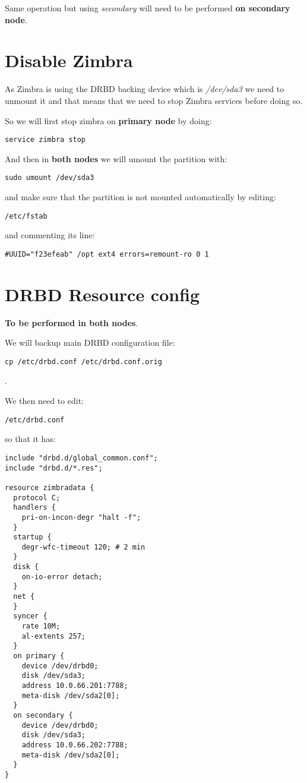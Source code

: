 Same operation but using \textit{secondary} will need to be performed \textbf{on secondary node}.

\section {Disable Zimbra}
As Zimbra is using the DRBD backing device which is \textit{/dev/sda3} we need to unmount it and that means that we need to stop Zimbra services before doing so.

So we will first stop zimbra on \textbf{primary node} by doing:
\begin{verbatim}
service zimbra stop
\end{verbatim}

And then in \textbf{both nodes} we will umount the partition with:
\begin{verbatim}
sudo umount /dev/sda3
\end{verbatim}
and make sure that the partition is not mounted automatically by editing:
\begin{verbatim}
/etc/fstab
\end{verbatim}
and commenting its line:
\begin{verbatim}
#UUID="f23efeab" /opt ext4 errors=remount-ro 0 1
\end{verbatim}

\section {DRBD Resource config}
\textbf{To be performed in both nodes}.

We will backup main DRBD configuration file:
\begin{verbatim}
cp /etc/drbd.conf /etc/drbd.conf.orig
\end{verbatim}
.

We then need to edit:
\begin{verbatim}
/etc/drbd.conf
\end{verbatim}
so that it has:
\begin{verbatim}
include "drbd.d/global_common.conf";
include "drbd.d/*.res";

resource zimbradata {
  protocol C;
  handlers {
    pri-on-incon-degr "halt -f";
  }
  startup {
    degr-wfc-timeout 120; # 2 min
  }
  disk {
    on-io-error detach;
  }
  net {
  }
  syncer {
    rate 10M;
    al-extents 257;
  }
  on primary {
    device /dev/drbd0;
    disk /dev/sda3;
    address 10.0.66.201:7788;
    meta-disk /dev/sda2[0];
  }
  on secondary {
    device /dev/drbd0;
    disk /dev/sda3;
    address 10.0.66.202:7788;
    meta-disk /dev/sda2[0];
  }
}
\end{verbatim}

